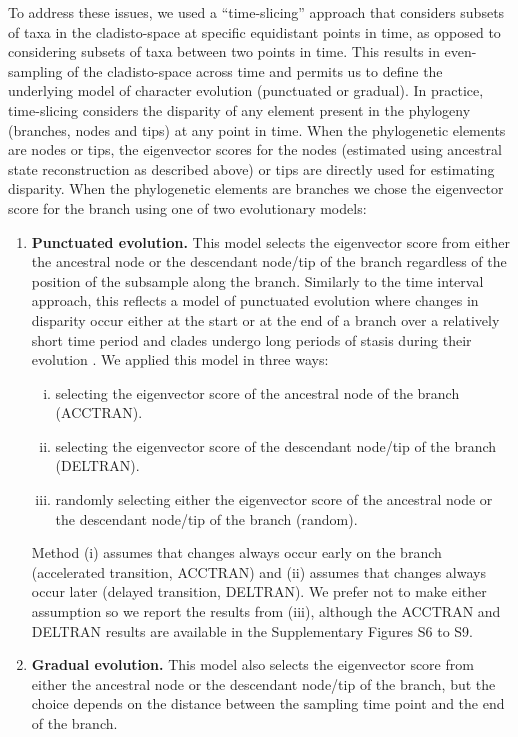 \documentclass[12pt,letterpaper]{article}
\begin{document}
To address these issues, we used a ``time-slicing'' approach that considers subsets of taxa in the cladisto-space at specific equidistant points in time, as opposed to considering subsets of taxa between two points in time.
This results in even-sampling of the cladisto-space across time and permits us to define the underlying model of character evolution (punctuated or gradual).  
In practice, time-slicing considers the disparity of any element present in the phylogeny (branches, nodes and tips) at any point in time.
When the phylogenetic elements are nodes or tips, the eigenvector scores for the nodes (estimated using ancestral state reconstruction as described above) or tips are directly used for estimating disparity.
When the phylogenetic elements are branches we chose the eigenvector score for the branch using one of two evolutionary models:
\begin{enumerate}
    \item{\textbf{Punctuated evolution.}} 
    This model selects the eigenvector score from either the ancestral node or the descendant node/tip of the branch regardless of the position of the subsample along the branch. 
    Similarly to the time interval approach, this reflects a model of punctuated evolution where changes in disparity occur either at the start or at the end of a branch over a relatively short time period and clades undergo long periods of stasis during their evolution \cite{Gould1977,Hunt21042015}.
    We applied this model in three ways: 
    \begin{enumerate}[(i)]
      \item selecting the eigenvector score of the ancestral node of the branch (ACCTRAN).
      \item selecting the eigenvector score of the descendant node/tip of the branch (DELTRAN).
      \item randomly selecting either the eigenvector score of the ancestral node or the descendant node/tip of the branch (random).
    \end{enumerate}
    Method (i) assumes that changes always occur early on the branch (accelerated transition, ACCTRAN) and (ii) assumes that changes always occur later (delayed transition, DELTRAN).
    We prefer not to make either assumption so we report the results from (iii), although the ACCTRAN and DELTRAN results are available in the Supplementary Figures S6 to S9.
    \item{\textbf{Gradual evolution.}}
    This model also selects the eigenvector score from either the ancestral node or the descendant node/tip of the branch, but the choice depends on the distance between the sampling time point and the end of the branch.

\end{enumerate}
\end{document}
